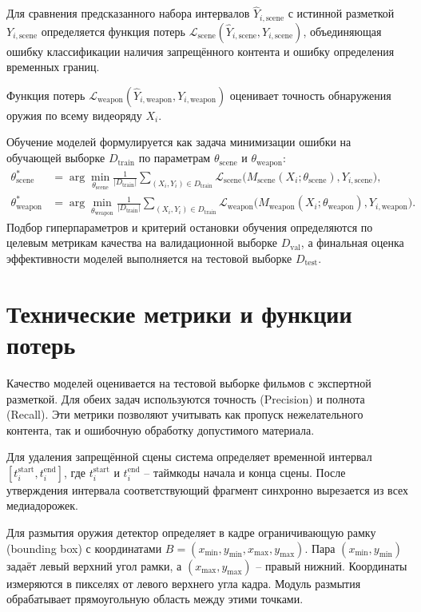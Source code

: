 \documentclass[a4paper,14pt]{extarticle}
\begin{document}
    Для сравнения предсказанного набора интервалов $\hat{Y}_{i,\text{scene}}$ с истинной разметкой $Y_{i,\text{scene}}$ определяется функция потерь $\mathcal{L}_{\text{scene}}(\hat{Y}_{i,\text{scene}}, Y_{i,\text{scene}})$, объединяющая ошибку классификации наличия запрещённого контента и ошибку определения временных границ.

    Функция потерь $\mathcal{L}_{\text{weapon}}(\hat{Y}_{i,\text{weapon}}, Y_{i,\text{weapon}})$ оценивает точность обнаружения оружия по всему видеоряду $X_i$.

    Обучение моделей формулируется как задача минимизации ошибки на обучающей выборке $D_{\text{train}}$ по параметрам $\theta_{\text{scene}}$ и $\theta_{\text{weapon}}$:
    \begin{align*}
        \theta_{\text{scene}}^* &= \arg\min_{\theta_{\text{scene}}} \frac{1}{|D_{\text{train}}|} \sum_{(X_i, Y_i) \in D_{\text{train}}} \mathcal{L}_{\text{scene}}\big(M_{\text{scene}}(X_i; \theta_{\text{scene}}), Y_{i,\text{scene}}\big), \\
        \theta_{\text{weapon}}^* &= \arg\min_{\theta_{\text{weapon}}} \frac{1}{|D_{\text{train}}|} \sum_{(X_i, Y_i) \in D_{\text{train}}} \mathcal{L}_{\text{weapon}}\big(M_{\text{weapon}}(X_i; \theta_{\text{weapon}}), Y_{i,\text{weapon}}\big).
    \end{align*}
    Подбор гиперпараметров и критерий остановки обучения определяются по целевым метрикам качества на валидационной выборке $D_{\text{val}}$, а финальная оценка эффективности моделей выполняется на тестовой выборке $D_{\text{test}}$.

    \section{Технические метрики и функции потерь}
    Качество моделей оценивается на тестовой выборке фильмов с экспертной разметкой. 
    Для обеих задач используются точность (Precision) и полнота (Recall). 
    Эти метрики позволяют учитывать как пропуск нежелательного контента, так и ошибочную обработку допустимого материала.

    Для удаления запрещённой сцены система определяет временной интервал $[t_i^{\text{start}}, t_i^{\text{end}}]$, где $t_i^{\text{start}}$ и $t_i^{\text{end}}$ -- таймкоды начала и конца сцены. 
    После утверждения интервала соответствующий фрагмент синхронно вырезается из всех медиадорожек.

    Для размытия оружия детектор определяет в кадре ограничивающую рамку (bounding box) с координатами $B=(x_{\min}, y_{\min}, x_{\max}, y_{\max})$. 
    Пара $(x_{\min}, y_{\min})$ задаёт левый верхний угол рамки, а $(x_{\max}, y_{\max})$ -- правый нижний. 
    Координаты измеряются в пикселях от левого верхнего угла кадра. 
    Модуль размытия обрабатывает прямоугольную область между этими точками.
\end{document}
